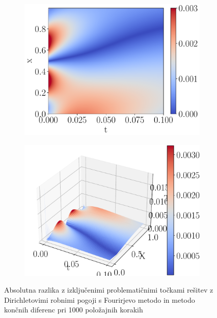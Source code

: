 \documentclass{article}
\begin{document}
\begin{figure}[H]
    \centering
    \begin{subfigure}{0.45\textwidth}
        \centering
        \includegraphics[width=\linewidth]{diffclean2d.pdf}
    \end{subfigure}
    \hspace{0.5cm}
    \begin{subfigure}{0.45\textwidth}
        \centering
        \includegraphics[width=\linewidth]{diffclean3d.pdf}
    \end{subfigure}
	\caption{Absolutna razlika z izključenimi problematičnimi točkami rešitev z Dirichletovimi robnimi pogoji s Fourirjevo metodo in metodo končnih diferenc pri 1000 položajnih korakih}
\end{figure}
\end{document}
